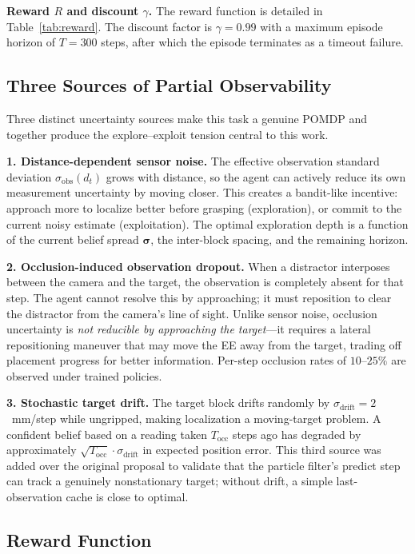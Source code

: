 \documentclass[conference]{IEEEtran}
\newcommand{\Rew}{R}
\newcommand{\Disc}{\gamma}
\newcommand{\sigmaobs}{\sigma_{\text{obs}}}
\newcommand{\sdrift}{\sigma_{\text{drift}}}
\begin{document}
\textbf{Reward $\Rew$ and discount $\Disc$.}
The reward function is detailed in Table~\ref{tab:reward}.
The discount factor is $\Disc=0.99$ with a maximum episode horizon of
$T=300$ steps, after which the episode terminates as a timeout failure.

\subsection{Three Sources of Partial Observability}

Three distinct uncertainty sources make this task a genuine POMDP and
together produce the explore--exploit tension central to this work.

\textbf{1. Distance-dependent sensor noise.}
The effective observation standard deviation $\sigmaobs(d_t)$ grows with
distance, so the agent can actively reduce its own measurement uncertainty
by moving closer.
This creates a bandit-like incentive: approach more to localize better
before grasping (exploration), or commit to the current noisy estimate
(exploitation).
The optimal exploration depth is a function of the current belief
spread $\bm{\sigma}$, the inter-block spacing, and the remaining horizon.

\textbf{2. Occlusion-induced observation dropout.}
When a distractor interposes between the camera and the target, the
observation is completely absent for that step.
The agent cannot resolve this by approaching; it must reposition to
clear the distractor from the camera's line of sight.
Unlike sensor noise, occlusion uncertainty is \emph{not reducible by
approaching the target}---it requires a lateral repositioning maneuver
that may move the EE away from the target, trading off placement
progress for better information.
Per-step occlusion rates of $10$--$25\%$ are observed under trained
policies.

\textbf{3. Stochastic target drift.}
The target block drifts randomly by $\sdrift=2$~mm/step while ungripped,
making localization a moving-target problem.
A confident belief based on a reading taken $T_{\text{occ}}$ steps ago
has degraded by approximately $\sqrt{T_{\text{occ}}}\cdot\sdrift$ in
expected position error.
This third source was added over the original proposal to validate that
the particle filter's predict step can track a genuinely nonstationary
target; without drift, a simple last-observation cache is close to
optimal.

\subsection{Reward Function}
\end{document}
